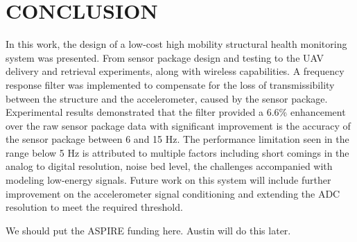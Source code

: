 \documentclass[]{spie}  %
\newcommand{\bl}[1]{\textcolor[rgb]{0.00,0.00,1.00}{#1}}
\begin{document}
	\section{CONCLUSION}
	In this work, the design of a low-cost high mobility structural health monitoring system was presented. From sensor package design and testing to the UAV delivery and retrieval experiments, along with wireless capabilities. A frequency response filter was implemented to compensate for the loss of transmissibility between the structure and the accelerometer, caused by the sensor package. Experimental results demonstrated that the filter provided a 6.6\% enhancement over the raw sensor package data with significant improvement is the accuracy of the sensor package between 6 and 15 Hz. The performance limitation seen in the range below 5 Hz is attributed to multiple factors including short comings in the analog to digital resolution, noise bed level, the challenges accompanied with modeling low-energy signals. Future work on this system will include further improvement on the accelerometer signal conditioning and extending the ADC resolution to meet the required threshold.  
	
	\acknowledgments %
	
	\bl{We should put the ASPIRE funding here. Austin will do this later.}

	
\end{document}
